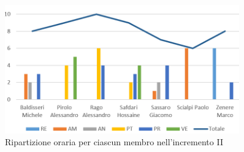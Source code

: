 \begin{figure}[!htb]   
    \centering
    \includegraphics[width=0.9\textwidth]{Images/per3}
	\caption{Ripartizione oraria per ciascun membro nell'incremento II}
\end{figure}
%
%
% 	
% 
